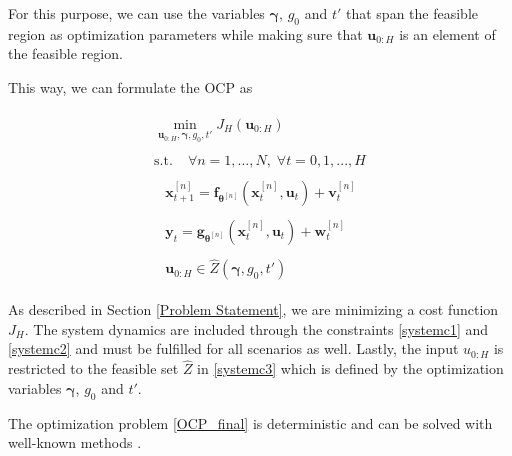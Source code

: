 For this purpose, we can use the variables $\boldsymbol{\gamma}$, $g_0$ and $t'$ that span the feasible region as optimization parameters while making sure that $\boldsymbol{u}_{0:H}$ is an element of the feasible region.

This way, we can formulate the OCP as

\begin{subequations}
\begin{align}
\begin{split}
\min\limits_{\boldsymbol{u}_{0:H},\boldsymbol{\gamma}, g_0, t' }  J_H(\boldsymbol{u}_{0:H})
\end{split}\\
\begin{split}
\text{s.t.}\; &\forall n = 1,...,N, \;  \forall t = 0,1,...,H
\end{split}\\
\begin{split}\label{systemc1}
&\boldsymbol{x}_{t+1}^{[n]} = \boldsymbol{f}_{\boldsymbol{\theta}^{[n]}} \left( \boldsymbol{x}_{t}^{[n]} , \boldsymbol{u}_t \right) + \boldsymbol{v}_{t}^{[n]}
\end{split}\\
\begin{split}\label{systemc2}
&\boldsymbol{y}_{t} = \boldsymbol{g}_{\boldsymbol{\theta}^{[n]}} \left( \boldsymbol{x}_{t}^{[n]}, \boldsymbol{u}_t \right) + \boldsymbol{w}_{t}^{[n]}
\end{split}\\
\begin{split}\label{systemc3}
 &\boldsymbol{u}_{0:H} \in \hat{Z}(\boldsymbol{\gamma}, g_0, t')
\end{split}
\end{align}
\label{OCP_final}
\end{subequations}

As described in Section \ref{Problem Statement}, we are minimizing a cost function $J_H$. The system dynamics are included through the constraints \eqref{systemc1} and \eqref{systemc2} and must be fulfilled for all scenarios as well. Lastly, the input $u_{0:H}$ is restricted to the feasible set $\hat{Z}$ in \eqref{systemc3} which is defined by the optimization variables $\boldsymbol{\gamma}$, $g_0$ and $t'$.

The optimization problem \eqref{OCP_final} is deterministic and can be solved with well-known methods \cite{Nocedal_06}.




